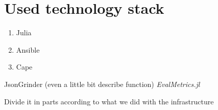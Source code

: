 \chapter{Used technology stack} \label{app:technologies}
\begin{enumerate}
    \item Julia
    \item Ansible
    \item Cape
\end{enumerate}


JsonGrinder (even a little bit describe function)
\emph{EvalMetrics.jl}

Divide it in parts according to what we did with the infrastructure